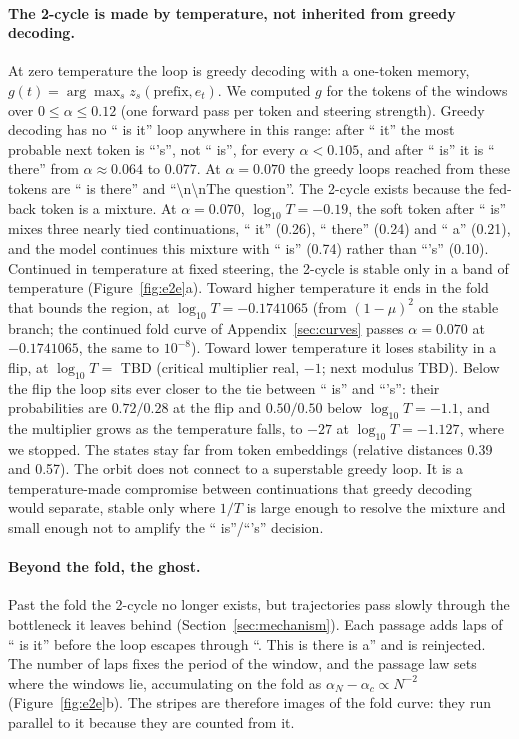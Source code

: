 \paragraph{The 2-cycle is made by temperature, not inherited from greedy decoding.} At zero temperature the loop is
greedy decoding with a one-token memory, $g(t)=\arg\max_s z_s(\text{prefix},e_t)$. We computed $g$ for the tokens of
the windows over $0\le\alpha\le0.12$ (one forward pass per token and steering strength). Greedy decoding has no
`` is it'' loop anywhere in this range: after `` it'' the most probable next token is ``'s'', not `` is'', for every
$\alpha<0.105$, and after `` is'' it is `` there'' from $\alpha\approx0.064$ to $0.077$. At $\alpha=0.070$ the greedy
loops reached from these tokens are `` is there'' and ``\textbackslash n\textbackslash nThe question''. The 2-cycle
exists because the fed-back token is a mixture. At $\alpha=0.070$, $\log_{10}T=-0.19$, the soft token after `` is''
mixes three nearly tied continuations, `` it'' (0.26), `` there'' (0.24) and `` a'' (0.21), and the model continues
this mixture with `` is'' (0.74) rather than ``'s'' (0.10). Continued in temperature at fixed steering, the 2-cycle is
stable only in a band of temperature (Figure~\ref{fig:e2e}a). Toward higher temperature it ends in the fold that
bounds the region, at $\log_{10}T=-0.1741065$ (from $(1-\mu)^2$ on the stable branch; the continued fold curve of
Appendix~\ref{sec:curves} passes $\alpha=0.070$ at $-0.1741065$, the same to $10^{-8}$). Toward lower temperature it
loses stability in a flip, at $\log_{10}T=$ TBD (critical multiplier real, $-1$; next modulus TBD). Below the flip the
loop sits ever closer to the tie between `` is'' and ``'s'': their probabilities are $0.72/0.28$ at the flip and
$0.50/0.50$ below $\log_{10}T=-1.1$, and the multiplier grows as the temperature falls, to $-27$ at
$\log_{10}T=-1.127$, where we stopped. The states stay far from token embeddings (relative distances 0.39 and 0.57).
The orbit does not connect to a superstable greedy loop. It is a temperature-made compromise between continuations
that greedy decoding would separate, stable only where $1/T$ is large enough to resolve the mixture and small enough
not to amplify the `` is''/``'s'' decision.

\paragraph{Beyond the fold, the ghost.} Past the fold the 2-cycle no longer exists, but trajectories pass slowly
through the bottleneck it leaves behind (Section~\ref{sec:mechanism}). Each passage adds laps of `` is it'' before
the loop escapes through ``. This is there is a'' and is reinjected. The number of laps fixes the period of the
window, and the passage law sets where the windows lie, accumulating on the fold as
$\alpha_N-\alpha_c\propto N^{-2}$ (Figure~\ref{fig:e2e}b). The stripes are therefore images of the fold curve: they
run parallel to it because they are counted from it.

